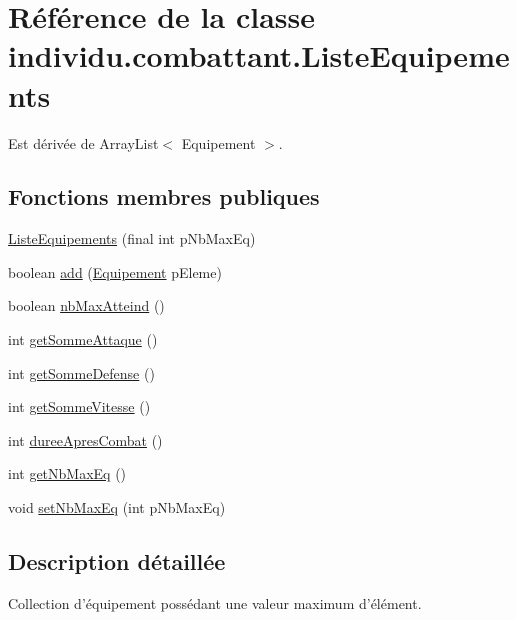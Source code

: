 \hypertarget{classindividu_1_1combattant_1_1_liste_equipements}{\section{Référence de la classe individu.\-combattant.\-Liste\-Equipements}
\label{classindividu_1_1combattant_1_1_liste_equipements}
}


Est dérivée de Array\-List$<$ Equipement $>$.

\subsection*{Fonctions membres publiques}
\begin{DoxyCompactItemize}
\item 
\hyperlink{classindividu_1_1combattant_1_1_liste_equipements_a7504b743eea66dd791f726abd0ce001d}{Liste\-Equipements} (final int p\-Nb\-Max\-Eq)
\item 
boolean \hyperlink{classindividu_1_1combattant_1_1_liste_equipements_a0c42c384b01ae1bee9f699e3ac982a4c}{add} (\hyperlink{classindividu_1_1equipement_1_1_equipement}{Equipement} p\-Eleme)
\item 
boolean \hyperlink{classindividu_1_1combattant_1_1_liste_equipements_a5b256703d5a9cef1deb013eff6ae34ff}{nb\-Max\-Atteind} ()
\item 
int \hyperlink{classindividu_1_1combattant_1_1_liste_equipements_a5b9385493928dd0a8d3d508b4f906e51}{get\-Somme\-Attaque} ()
\item 
int \hyperlink{classindividu_1_1combattant_1_1_liste_equipements_af7f605713d45e20433c34de1d27561b3}{get\-Somme\-Defense} ()
\item 
int \hyperlink{classindividu_1_1combattant_1_1_liste_equipements_aef396dda965399ad7f729bd9fa013392}{get\-Somme\-Vitesse} ()
\item 
int \hyperlink{classindividu_1_1combattant_1_1_liste_equipements_ae92d592c6d61c7a767f66e51118b9afa}{duree\-Apres\-Combat} ()
\item 
int \hyperlink{classindividu_1_1combattant_1_1_liste_equipements_abe918cd79ec7bc71655efbcdf320d86a}{get\-Nb\-Max\-Eq} ()
\item 
void \hyperlink{classindividu_1_1combattant_1_1_liste_equipements_a4ad481963d8b9c35a0994522c506bd48}{set\-Nb\-Max\-Eq} (int p\-Nb\-Max\-Eq)
\end{DoxyCompactItemize}


\subsection{Description détaillée}
Collection d'équipement possédant une valeur maximum d'élément. 

